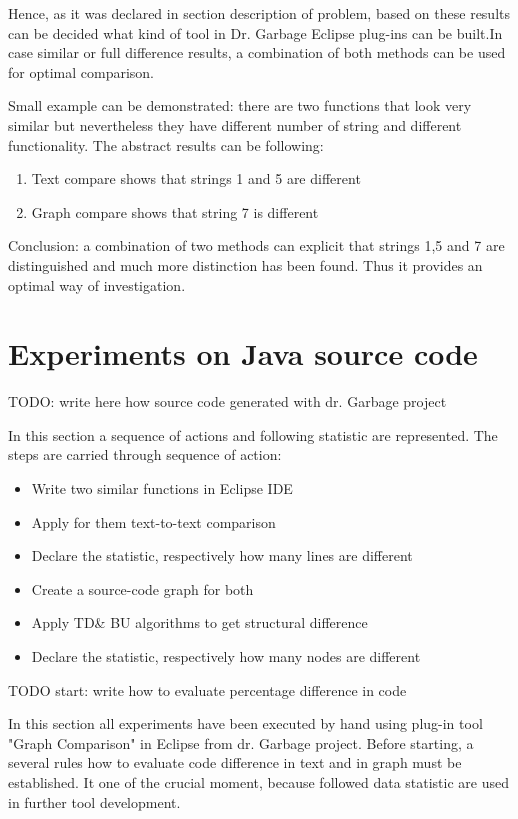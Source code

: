 \documentclass{report}
\begin{document}
Hence, as it was declared in section description of problem, based on these results can be decided what kind of tool in Dr. Garbage Eclipse plug-ins can be built.In case similar or full difference results, a combination of both methods can be used for optimal comparison. 

Small example can be demonstrated: there are two functions that look very similar but nevertheless they have different number of string and different functionality. The abstract results can be following:
\begin{enumerate}
	\item Text compare shows that strings 1 and 5 are different
	\item Graph compare shows that string 7 is different 
\end{enumerate}

Conclusion: a combination of two methods can explicit that strings 1,5 and 7 are distinguished and much more distinction has been found. Thus it provides an optimal way of investigation.



\section{Experiments on Java source code}

TODO: write here how source code generated with dr. Garbage project

In this section a sequence of actions and following statistic are represented. The steps are carried through sequence of action:
\begin{itemize}
	\item Write two similar functions in Eclipse IDE
	\item Apply for them text-to-text comparison
	\item Declare the statistic, respectively how many lines are different		
	\item Create a source-code graph for both
	\item Apply TD\& BU algorithms to get structural difference	
	\item Declare the statistic, respectively how many nodes are different			
\end{itemize}

TODO start: write how to evaluate percentage difference in code

In this section all experiments have been executed by hand using plug-in tool "Graph Comparison" in Eclipse from dr. Garbage project. Before starting, a several rules how to evaluate code difference in text and in graph must be established. It one of the crucial moment, because followed data statistic are used in further tool development.
\end{document}
